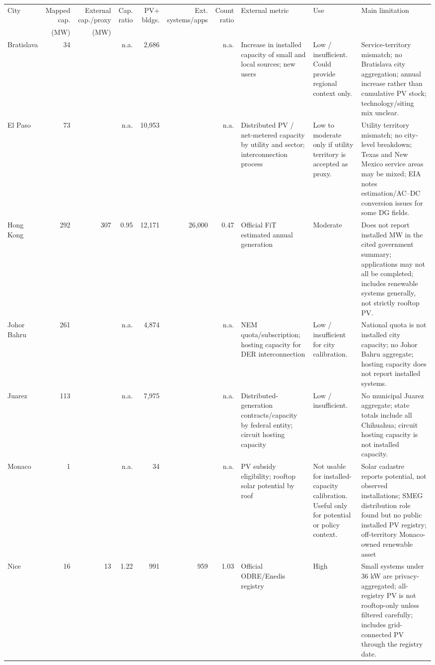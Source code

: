 \begin{tabular}{@{}p{1.45cm}rrrrrrp{3.4cm}p{2.1cm}p{3.8cm}@{}}
\toprule
City & Mapped cap. & External cap./proxy & Cap. ratio & PV+ bldgs. & Ext. systems/apps & Count ratio & External metric & Use & Main limitation \\
 & (MW) & (MW) & & & & & & & \\
\midrule
Bratislava & 34 &  & n.a. & 2,686 &  & n.a. & Increase in installed capacity of small and local sources; new users & Low / insufficient. Could provide regional context only. & Service-territory mismatch; no Bratislava city aggregation; annual increase rather than cumulative PV stock; technology/siting mix unclear. \\
El Paso & 73 &  & n.a. & 10,953 &  & n.a. & Distributed PV / net-metered capacity by utility and sector; interconnection process & Low to moderate only if utility territory is accepted as proxy. & Utility territory mismatch; no city-level breakdown; Texas and New Mexico service areas may be mixed; EIA notes estimation/AC–DC conversion issues for some DG fields. \\
Hong Kong & 292 & 307 & 0.95 & 12,171 & 26,000 & 0.47 & Official FiT estimated annual generation & Moderate & Does not report installed MW in the cited government summary; applications may not all be completed; includes renewable systems generally, not strictly rooftop PV. \\
Johor Bahru & 261 &  & n.a. & 4,874 &  & n.a. & NEM quota/subscription; hosting capacity for DER interconnection & Low / insufficient for city calibration. & National quota is not installed city capacity; no Johor Bahru aggregate; hosting capacity does not report installed systems. \\
Juarez & 113 &  & n.a. & 7,975 &  & n.a. & Distributed-generation contracts/capacity by federal entity; circuit hosting capacity & Low / insufficient. & No municipal Juarez aggregate; state totals include all Chihuahua; circuit hosting capacity is not installed capacity. \\
Monaco & 1 &  & n.a. & 34 &  & n.a. & PV subsidy eligibility; rooftop solar potential by roof & Not usable for installed-capacity calibration. Useful only for potential or policy context. & Solar cadastre reports potential, not observed installations; SMEG distribution role found but no public installed PV registry; off-territory Monaco-owned renewable asset \\
Nice & 16 & 13 & 1.22 & 991 & 959 & 1.03 & Official ODRE/Enedis registry & High & Small systems under 36 kW are privacy-aggregated; all-registry PV is not rooftop-only unless filtered carefully; includes grid-connected PV through the registry date. \\

\end{tabular}
